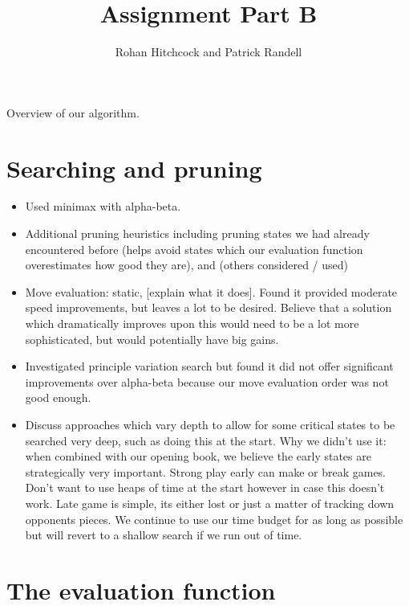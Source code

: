 \documentclass[11pt]{article}
\newcommand{\drafting}[1]{\textcolor{OliveGreen}{#1}}
\begin{document}
\title{\textbf{Assignment Part B}}
\author{Rohan Hitchcock and Patrick Randell}
\date{}
\maketitle

\drafting{
    Overview of our algorithm.
}

\section{Searching and pruning}
\drafting{
    \begin{itemize}
        \item Used minimax with alpha-beta.
        \item Additional pruning heuristics including pruning states we had already encountered before (helps avoid states which our evaluation function overestimates how good they are), and (others considered / used)
        \item Move evaluation: static, [explain what it does]. Found it provided moderate speed improvements, but leaves a lot to be desired. Believe that a solution which dramatically improves upon this would need to be a lot more sophisticated, but would potentially have big gains.
        \item Investigated principle variation search but found it did not offer significant improvements over alpha-beta because our move evaluation order was not good enough. 
        \item Discuss approaches which vary depth to allow for some critical states to be searched very deep, such as doing this at the start. Why we didn't use it: when combined with our opening book, we believe the early states are strategically very important. Strong play early can make or break games. Don't want to use heaps of time at the start however in case this doesn't work. Late game is simple, its either lost or just a matter of tracking down opponents pieces. We continue to use our time budget for as long as possible but will revert to a shallow search if we run out of time.
    \end{itemize}
}

\section{The evaluation function}
\end{document}
